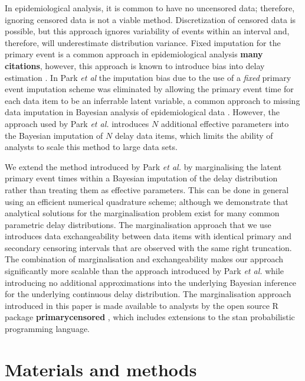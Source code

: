 \documentclass[10pt,letterpaper]{article}
\begin{document}
In epidemiological analysis, it is common to have no uncensored data; therefore, ignoring censored data is not a viable method. Discretization of censored data is possible, but this approach ignores variability of events within an interval and, therefore, will underestimate distribution variance. Fixed imputation for the primary event is a common approach in epidemiological analysis \textbf{many citations}, however, this approach is known to introduce bias into delay estimation \cite{law1992effects,Park2024.01.12.24301247}. In Park \textit{et al} \cite{Park2024.01.12.24301247} the imputation bias due to the use of a \textit{fixed} primary event imputation scheme was eliminated by allowing the primary event time for each data item to be an inferrable latent variable, a common approach to missing data imputation in Bayesian analysis of epidemiological data \cite{o1999bayesian}. However, the approach used by Park \textit{ et al.} introduces $N$ additional effective parameters into the Bayesian imputation of $N$ delay data items, which limits the ability of analysts to scale this method to large data sets.

We extend the method introduced by Park \textit{ et al.} by marginalising the latent primary event times within a Bayesian imputation of the delay distribution rather than treating them as effective parameters. This can be done in general using an efficient numerical quadrature scheme; although we demonstrate that analytical solutions for the marginalisation problem exist for many common parametric delay distributions. The marginalisation approach that we use introduces data exchangeability \cite{gelman_bayesian_2013} between data items with identical primary and secondary censoring intervals that are observed with the same right truncation. The combination of marginalisation and exchangeability makes our approach significantly more scalable than the approach introduced by Park \textit{ et al.} \cite{Park2024.01.12.24301247} while introducing no additional approximations into the underlying Bayesian inference for the underlying continuous delay distribution. The marginalisation approach introduced in this paper is made available to analysts by the open source R package \textbf{primarycensored} \cite{abbottprimarycensored}, which includes extensions to the stan probabilistic programming language.


\section*{Materials and methods}
\end{document}
